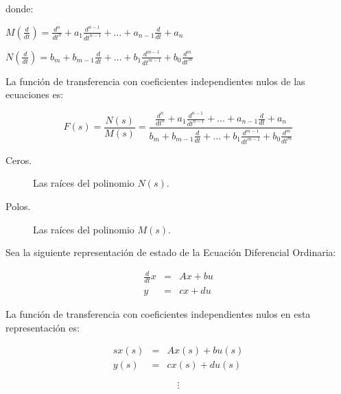         donde:

        \begin{math}
            M \left( \frac{d}{dt} \right) = \frac{d^n}{dt^n} + a_1 \frac{d^{n-1}}{dt^{n-1}} + \dots + a_{n-1} \frac{d}{dt} + a_n
        \end{math}

        \begin{math}
            N \left( \frac{d}{dt} \right) = b_m + b_{m-1} \frac{d}{dt} + \dots + b_1 \frac{d^{m-1}}{dt^{m-1}} + b_0 \frac{d^m}{dt^m}
        \end{math}

        La función de transferencia con coeficientes independientes nulos de las ecuaciones es:

        \begin{equation}
            F(s) = \frac{N(s)}{M(s)} = \frac{\frac{d^n}{dt^n} + a_1 \frac{d^{n-1}}{dt^{n-1}} + \dots + a_{n-1} \frac{d}{dt} + a_n}{b_m + b_{m-1} \frac{d}{dt} + \dots + b_1 \frac{d^{m-1}}{dt^{m-1}} + b_0 \frac{d^m}{dt^m}}
        \end{equation}

        \begin{description}
            \item [Ceros.] Las raíces del polinomio $N(s)$.
            \item [Polos.] Las raíces del polinomio $M(s)$.
        \end{description}

        Sea la siguiente representación de estado de la Ecuación Diferencial Ordinaria:

        \begin{eqnarray}
        \frac{d}{dt} x & = & A x + b u \nonumber \\
        y & = & c x + d u \nonumber
        \end{eqnarray}

        La función de transferencia con coeficientes independientes nulos en esta representación es:

        \begin{eqnarray}
        s x(s) & = & A x(s) + b u(s) \nonumber \\
        y(s) & = & c x(s) + d u(s) \nonumber
        \end{eqnarray}

        \begin{equation}
            \vdots \nonumber
        \end{equation}

